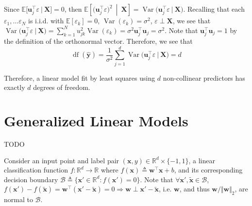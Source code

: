 \documentclass{article}
\numberwithin{equation}{section}
\begin{document}
Since $ \mathbb{E}\big[\mathbf{u}_j^\top\varepsilon \ \big| \
\mathbf{X}\big] = 0 $, then $ \mathbb{E}\left[\big(\mathbf{u}_j^\top
\varepsilon\big)^2 \ \middle\vert \ \mathbf{X}\right] = \operatorname{Var}
\big(\mathbf{u}_j^\top\varepsilon \ \big| \ \mathbf{X}\big) $. Recalling
that each $ \varepsilon_1, \ldots \varepsilon_N $ is i.i.d. with
$ \mathbb{E}[\varepsilon_k] = 0 $, $ \operatorname{Var}(\varepsilon_k) =
\sigma^2 $, $ \varepsilon \perp \mathbf{X} $, we see that
$ \operatorname{Var}\big(\mathbf{u}_j^\top\varepsilon \ \big| \
\mathbf{X}\big) = \sum_{k = 1}^Nu_{jk}^2\operatorname{Var}(\varepsilon_k) =
\sigma^2\mathbf{u}_j^\top\mathbf{u}_j = \sigma^2 $. Note that
$ \mathbf{u}_j^\top\mathbf{u}_j = 1 $ by the definition of the orthonormal
vector. Therefore, we see that
\begin{equation*}
    \operatorname{df}(\hat{\mathbf{y}}) =
    \frac{1}{\sigma^2}\sum_{j = 1}^d\operatorname{Var}\big(
        \mathbf{u}_j^\top\varepsilon \ \big| \ \mathbf{X}
    \big) = d
\end{equation*}

Therefore, a linear model fit by least squares using $ d $ non-collinear
predictors has exactly $ d $ degrees of freedom.

\section{Generalized Linear Models}


TODO


Consider an input point and label pair $ (\mathbf{x}, y) \in \mathbb{R}^d
\times \{-1, 1\} $, a linear classification function
$ f : \mathbb{R}^d \rightarrow \mathbb{R} $ where
$ f(\mathbf{x}) \triangleq \mathbf{w}^\top\mathbf{x} + b $, and its
corresponding decision boundary $ \mathcal{B} \triangleq \{\mathbf{x}' \in
\mathbb{R}^d : f(\mathbf{x}') = 0\} $. Note that $ \forall \mathbf{x}', \tilde{\mathbf{x}} \in \mathcal{B} $, $ f(\mathbf{x}') - f(\tilde{\mathbf{x}}) = \mathbf{w}^\top(\mathbf{x}' - \tilde{\mathbf{x}}) = 0 \Rightarrow \mathbf{w} \perp \mathbf{x}' - \tilde{\mathbf{x}} $, i.e. $ \mathbf{w} $, and thus $ \mathbf{w} / \Vert\mathbf{w}\Vert_2 $, are normal to $ \mathcal{B} $.

\medskip
\end{document}
